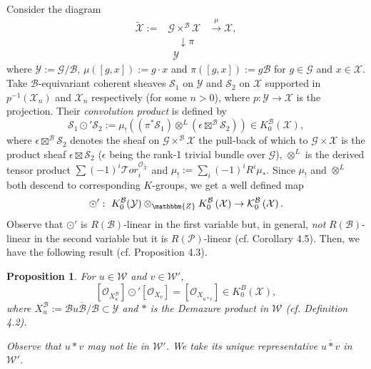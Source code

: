 \documentclass{article}
\newtheorem{proposition}[theorem]{Proposition}
\def\G{\mathcal{G}}
\def\P{\mathcal{P}}
\def\X{\mathcal{X}}
\def\B{\mathcal{B}}
\def\W{\mathcal{W}}
\def\Y{\mathcal{Y}}
\def\K{\mathcal{K}}
\def\ref#1{#1}
\def\Tor{\rm{Tor}}
\def\Tor{\mathcal{T}or}
\begin{document}
Consider the diagram
$$
\begin{array}{lll}
\tilde{\X}:=& \G \times^{\B} \X & \xrightarrow{\mu} \X,\\
&\quad \downarrow \pi&\\
& \,\,\, \Y
\end{array}
$$
where $\Y:=\G/\B$, $\mu([g,x]):=g\cdot x$ and $\pi ([g,x]):= g\B$ for $g\in \G$ and $x\in \X$. 
Take $\B$-equivariant coherent sheaves $\mathcal{S}_1$ on $\Y$ and $\mathcal{S}_2$ on $\X$ supported in $p^{-1}(\X_n)$ and $\X_n$  respectively (for some $n>0$), where $p:\Y \rightarrow \X$ is the projection. Their {\it convolution product} is defined by 
$$
\mathcal{S}_1 \odot' \mathcal{S}_2 := \mu_! \left( \left( \pi^* \mathcal{S}_1\right) \otimes^L \left( \epsilon \boxtimes^{\B}\mathcal{S}_2\right)\right) \in K_0^\B \left(\X\right),
$$
where $\epsilon \boxtimes^{\B}\mathcal{S}_2$ denotes the sheaf on $\G\times^{\B} \X$ the pull-back of which to $\G \times \X$ is the product sheaf $\epsilon \boxtimes\mathcal{S}_2$ 
($\epsilon$ being the rank-1 trivial bundle over $\G$),
 $\otimes^L$ is the derived tensor product $\sum(-1)^i \Tor_i^{\mathcal{O}_{\tilde{\X}}}$ and $\mu_! :=\sum_i (-1)^i R^i \mu_*$.
Since $\mu_!$ and $\otimes^L$ both descend to corresponding $K$-groups, we get a well defined map
$$
\odot ': ~ K_0^\B(\Y) \otimes _\mathbbm{Z} K_0^\B \left(\X\right) \rightarrow \K_0^\B \left(\X\right). 
$$
Observe that $\odot '$ is $R(\B)$-linear in the first variable but, in general, {\it not} $R(\B)$-linear in the second variable but it is $R(\P)$-linear (cf. Corollary \ref{4.5}). 
Then, we have the following result (cf. Proposition \ref{4.3}).

\begin{proposition} \label{1.4}
For $u\in \W$ and $v\in \W'$,
$$
\left[\mathcal{O}_{X^\B_u}\right] \odot'\left [\mathcal{O}_{X_v}\right] =\left [\mathcal{O}_{X_{\overline{u*v}}}\right] \in K_0^B\left(\X\right) ,
$$
where ${X^\B_u}:= \overline{\B u\B/\B} \subset \Y$ and $*$ is the Demazure product in $\W$ (cf. Definition \ref{4.2}).

Observe that $u*v$ may not lie in $\W'$. We take its unique representative $\overline{u*v}$ in $\W'$. 
\end{proposition}
\end{document}
